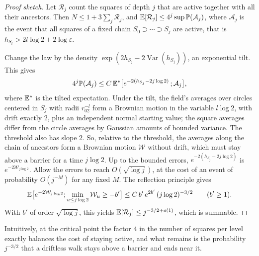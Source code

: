 \begin{proof}[Proof sketch]
Let $\mathcal R_j$ count the squares of depth $j$ that are active together with all their ancestors.
Then $N\le1+3\sum_j\mathcal R_j$, and $\mathbb{E}[\mathcal R_j]\le4^j\sup\mathbb{P}(\mathcal A_j)$, where $\mathcal A_j$ is the event that all squares of
a fixed chain $S_0\supset\cdots\supset S_j$ are active, that is $h_{S_l}>2l\log2+2\log\varepsilon$.

Change the law by the density $\exp(2h_{S_j}-2\operatorname{Var}(h_{S_j}))$, an exponential tilt.
This gives
\[
4^j\mathbb{P}(\mathcal A_j)\le C\,\mathbb{E}^*\bigl[e^{-2(h_{S_j}-2j\log2)}\,;\mathcal A_j\bigr],
\]
where $\mathbb{E}^*$ is the tilted expectation. Under the tilt, the field's averages over circles
centered in $S_j$ with radii $r_02^{-l}$ form a Brownian motion in the variable $l\log2$, with
drift exactly $2$, plus an independent normal starting value; the square averages differ from the
circle averages by Gaussian amounts of bounded variance. The threshold also has slope $2$. So,
relative to the threshold, the averages along the chain of ancestors form a Brownian motion
$\mathcal W$ without drift, which must stay above a barrier for a time $j\log2$. Up to the bounded
errors, $e^{-2(h_{S_j}-2j\log2)}$ is $e^{-2\mathcal W_{j\log2}}$.
Allow the errors to reach $O(\sqrt{\log j})$, at the cost of an event of probability
$O(j^{-M})$ for any fixed $M$. The reflection principle gives
\[
\mathbb{E}\bigl[e^{-2\mathcal W_{j\log2}};\min_{u\le j\log2}\mathcal W_u\ge-b'\bigr]\le C\,b'\,e^{2b'}\,(j\log2)^{-3/2}\qquad(b'\ge1).
\]
With $b'$ of order $\sqrt{\log j}$, this yields $\mathbb{E}[\mathcal R_j]\le j^{-3/2+o(1)}$, which is summable.
\end{proof}

Intuitively, at the critical point the factor $4$ in the number of squares per level exactly
balances the cost of staying active, and what remains is the probability $j^{-3/2}$ that a
driftless walk stays above a barrier and ends near it.
